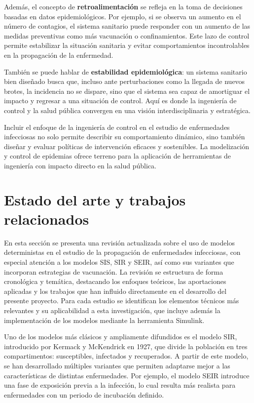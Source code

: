 Además, el concepto de \textbf{retroalimentación} se refleja en la toma de decisiones basadas en datos epidemiológicos. Por ejemplo, si se observa un aumento en el número de contagios, el sistema sanitario puede responder con un aumento de las medidas preventivas como más vacunación o confinamientos. Este lazo de control permite estabilizar la situación sanitaria y evitar comportamientos incontrolables en la propagación de la enfermedad.

También se puede hablar de \textbf{estabilidad epidemiológica}: un sistema sanitario bien diseñado busca que, incluso ante perturbaciones como la llegada de nuevos brotes, la incidencia no se dispare, sino que el sistema sea capaz de amortiguar el impacto y regresar a una situación de control. Aquí es donde la ingeniería de control y la salud pública convergen en una visión interdisciplinaria y estratégica.

Incluir el enfoque de la ingeniería de control en el estudio de enfermedades infecciosas no solo permite describir su comportamiento dinámico, sino también diseñar y evaluar políticas de intervención eficaces y sostenibles. La modelización y control de epidemias ofrece terreno para la aplicación de herramientas de ingeniería con impacto directo en la salud pública.

\section{Estado del arte y trabajos relacionados}
En esta sección se presenta una revisión actualizada sobre el uso de modelos deterministas en el estudio de la propagación de enfermedades infecciosas, con especial atención a los modelos SIS, SIR y SEIR, así como sus variantes que incorporan estrategias de vacunación. La revisión se estructura de forma cronológica y temática, destacando los enfoques teóricos, las aportaciones aplicadas y los trabajos que han influido directamente en el desarrollo del presente proyecto. Para cada estudio se identifican los elementos técnicos más relevantes y su aplicabilidad a esta investigación, que incluye además la implementación de los modelos mediante la herramienta Simulink.

Uno de los modelos más clásicos y ampliamente difundidos es el modelo SIR, introducido por Kermack y McKendrick en 1927, que divide la población en tres compartimentos: susceptibles, infectados y recuperados. A partir de este modelo, se han desarrollado múltiples variantes que permiten adaptarse mejor a las características de distintas enfermedades. Por ejemplo, el modelo SEIR introduce una fase de exposición previa a la infección, lo cual resulta más realista para enfermedades con un periodo de incubación definido.

